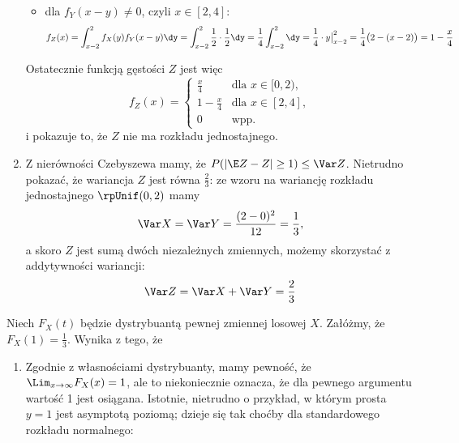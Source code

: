 \begin{solutions}
\begin{enumerate}[\bf A.]
\begin{itemize}
            \item dla $f_Y(x - y) \neq 0$, czyli $x \in [2, 4]$:
            $$f_Z(x) = \int_{x - 2}^{2} f_X(y) f_Y(x - y) \dy = \int_{x - 2}^{2} \frac{1}{2} \cdot \frac{1}{2} \dy = \frac{1}{4} \int_{x - 2}^{2} \dy = \frac{1}{4} \cdot y \big|_{x - 2}^2 = \frac{1}{4}\big(2 - (x - 2)\big) = 1 - \frac{x}{4}$$
        \end{itemize}

        Ostatecznie funkcją gęstości $Z$ jest więc
        $$
        f_Z(x) = \begin{cases}
            \frac{x}{4} & \text{dla } x \in [0, 2), \\
            1 - \frac{x}{4} & \text{dla } x \in [2, 4], \\
            0 & \text{wpp.}
        \end{cases}
        $$
        i pokazuje to, że $Z$ nie ma rozkładu jednostajnego.

        \item Z nierówności Czebyszewa mamy, że $P(|\E Z - Z| \geq 1) \leq \Var Z$. Nietrudno pokazać, że wariancja $Z$ jest równa $\frac{2}{3}$: ze wzoru na wariancję rozkładu jednostajnego $\rpUnif(0, 2)$ mamy
        $$\Var X = \Var Y = \frac{(2 - 0)^2}{12} = \frac{1}{3},$$
        a skoro $Z$ jest sumą dwóch niezależnych zmiennych, możemy skorzystać z addytywności wariancji:
        $$\Var Z = \Var X + \Var Y = \frac{2}{3}$$
    \end{enumerate}

    \sol Niech $F_{X}(t)$ będzie dystrybuantą pewnej zmiennej losowej $X$. Załóżmy, że $F_{X}(1)=\frac{1}{3}$. Wynika z tego, że

    \begin{enumerate}[\bf A.]
        \item Zgodnie z własnościami dystrybuanty, mamy pewność, że $\Lim_{x \to \infty} F_X(x) = 1$, ale to niekoniecznie oznacza, że dla pewnego argumentu wartość 1 jest osiągana. Istotnie, nietrudno o przykład, w którym prosta $y = 1$ jest asymptotą poziomą; dzieje się tak choćby dla standardowego rozkładu normalnego:

        \begin{center}
\end{center}
\end{enumerate}
\end{solutions}
